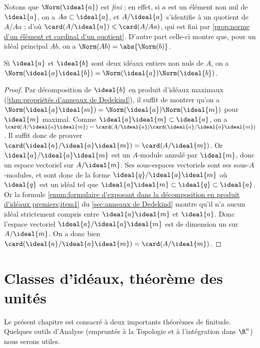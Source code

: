 \documentclass[11pt, %
  title in boldface,
  theorem in new line,
  theorem numbering = section,
  number theorems separately,
  simple name,
]{beaulivre}
\begin{document}
    Notons que \( \Norm(\ideal{a}) \) est \emph{fini} ; en effet, si \( a \) est un élément non nul de \( \ideal{a} \), on a \( Aa \subset \ideal{a} \), et \( A/\ideal{a} \) s'identifie à un quotient de \( A/Aa \) ; d'où \( \card(A/\ideal{a}) \leqslant \card(A/Aa) \), qui est fini par \cref{prop:norme d'un élément et cardinal d'un quotient}. D'autre part celle-ci montre que, pour un idéal principal \( Ab \), on a \( \Norm(Ab) = \abs{\Norm(b)} \).

    \begin{proposition}\label{prop:multiplicativité des normes}
        Si \( \ideal{a} \) et \( \ideal{b} \) sont deux idéaux entiers non nuls de \( A \), on a \( \Norm(\ideal{a}\ideal{b}) = \Norm(\ideal{a}) \Norm(\ideal{b}) \).
    \end{proposition}
    \begin{proof}
        Par décomposition de \( \ideal{b} \) en produit d'idéaux maximaux (\cref{thm:propriétés d'anneaux de Dedekind}), il suffit de montrer qu'on a \( \Norm(\ideal{a}\ideal{m}) = \Norm(\ideal{a}) \Norm(\ideal{m}) \) pour \( \ideal{m} \) maximal. Comme \( \ideal{a}\ideal{m} \subset \ideal{a} \), on a \( \card(A/\ideal{a}\ideal{m}) = \card(A/\ideal{a}) \card(\ideal{a}/\ideal{a}\ideal{m}) \). Il suffit donc de prouver \( \card(\ideal{a}/\ideal{a}\ideal{m}) = \card(A/\ideal{m}) \). Or \( \ideal{a}/\ideal{a}\ideal{m} \) est un \( A \)‑module annulé par \( \ideal{m} \), donc un espace vectoriel sur \( A/\ideal{m} \). Ses sous-espaces vectoriels sont ses sous-\( A \)‑modules, et sont donc de la forme \( \ideal{q}/\ideal{a}\ideal{m} \) où \( \ideal{q} \) est un idéal tel que \( \ideal{a}\ideal{m} \subset \ideal{q} \subset \ideal{a} \). Or la formule \ref{enum:formulaire d'exposant dans la décomposition en produit d'idéaux premiers;item1} du \cref{sec:anneaux de Dedekind} montre qu'il n'a aucun idéal strictement compris entre \( \ideal{a}\ideal{m} \) et \( \ideal{a} \). Donc l'espace vectoriel \( \ideal{a}/\ideal{a}\ideal{m} \) est de dimension un sur \( A/\ideal{m} \). On a donc bien \( \card(\ideal{a}/\ideal{a}\ideal{m}) = \card(A/\ideal{m}) \).
    \end{proof}


\chapter{Classes d'idéaux, théorème des unités}\label{chap:classes d'idéaux;théorème des unités}

Le présent chapitre est consacré à deux importants théorèmes de finitude. Quelques outils d'Analyse (empruntés à la Topologie et à l'intégration dans \( \R^n \)) nous serons utiles.
\end{document}
